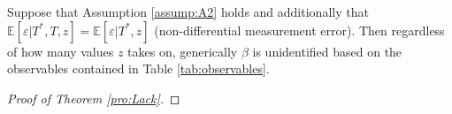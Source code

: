 %
\begin{thm}
  \label{pro:Lack}
  Suppose that Assumption \ref{assump:A2} holds and additionally that $\mathbb{E}[\varepsilon|T^*,T,z]=\mathbb{E}[\varepsilon|T^*,z]$ (non-differential measurement error).  
  Then regardless of how many values $z$ takes on, generically $\beta$ is unidentified based on the observables contained in Table \ref{tab:observables}.
\end{thm}
\begin{proof}[Proof of Theorem \ref{pro:Lack}]


\end{proof}
